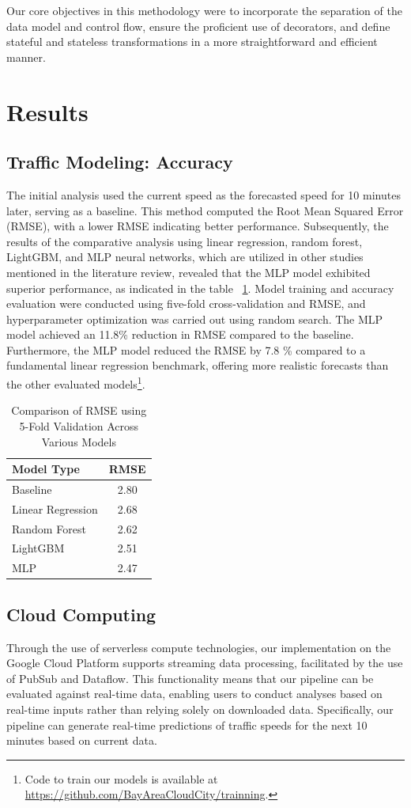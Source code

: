 Our core objectives in this methodology were to incorporate the separation of the data model and control flow, ensure the proficient use of decorators, and define stateful and stateless transformations in a more straightforward and efficient manner.

\section{Results}
\subsection{Traffic Modeling: Accuracy}
The initial analysis used the current speed as the forecasted speed for 10 minutes later, serving as a baseline. This method computed the Root Mean Squared Error (RMSE), with a lower RMSE indicating better performance. Subsequently, the results of the comparative analysis using linear regression, random forest, LightGBM, and MLP neural networks, which are utilized in other studies mentioned in the literature review, revealed that the MLP model exhibited superior performance, as indicated in the table ~\ref{table:rmse_comparison_transposed}. Model training and accuracy evaluation were conducted using five-fold cross-validation and RMSE, and hyperparameter optimization was carried out using random search. The MLP model achieved an 11.8\% reduction in RMSE compared to the baseline. Furthermore, the MLP model reduced the RMSE by 7.8 \% compared to a fundamental linear regression benchmark, offering more realistic forecasts than the other evaluated models\footnote{Code to train our models is available at \url{https://github.com/BayAreaCloudCity/trainning}.}.

\begin{table}[ht]
\centering
\begin{tabular}{l c}
 \hline
 Model Type & RMSE \\
 \hline
 Baseline & 2.80 \\
 Linear Regression & 2.68 \\
 Random Forest & 2.62 \\ 
 LightGBM & 2.51 \\
 MLP & 2.47 \\
 \hline
\end{tabular}
\caption{Comparison of RMSE using 5-Fold Validation Across Various Models}
\label{table:rmse_comparison_transposed}
\end{table}

\subsection{Cloud Computing}
Through the use of serverless compute technologies, our implementation on the Google Cloud Platform supports streaming data processing, facilitated by the use of PubSub and Dataflow. This functionality means that our pipeline can be evaluated against real-time data, enabling users to conduct analyses based on real-time inputs rather than relying solely on downloaded data. Specifically, our pipeline can generate real-time predictions of traffic speeds for the next 10 minutes based on current data.

